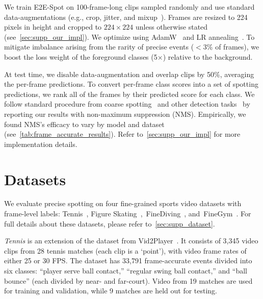 \documentclass[runningheads]{llncs}
\newcommand{\OURMETHOD}{{E2E-Spot}\xspace}
\newcommand{\finegym}{{FineGym}\xspace}
\newcommand{\finediving}{{FineDiving}\xspace}
\begin{document}
We train \OURMETHOD on 100-frame-long clips sampled randomly and use standard data-augmentations (e.g., crop, jitter, and mixup~\cite{mixup}).
Frames are resized to 224 pixels in height and cropped to $224\times224$ unless otherwise stated (see~\autoref{sec:supp_our_impl}).
We optimize using AdamW~\cite{adamw} and LR annealing~\cite{cosinelr}.
To mitigate imbalance arising from the rarity of precise events ($<3\%$ of frames), we boost the loss weight of the foreground classes (5$\times$) relative to the background.

At test time, we disable data-augmentation and overlap clips by 50\%, averaging
the per-frame predictions.
To convert per-frame class scores into a set of spotting
predictions, we rank all of the frames by their predicted score for each class.
We follow standard procedure from coarse spotting~\cite{soccernetv2} and other detection
tasks~\cite{rcnn} by reporting our results with non-maximum suppression
(NMS).
Empirically, we found NMS's efficacy to vary by model and dataset (see~\autoref{tab:frame_accurate_results}).
Refer to~\autoref{sec:supp_our_impl} for more implementation details.
 
\section{Datasets}
\label{sec:dataset}

We evaluate precise spotting on four fine-grained sports video datasets with
frame-level labels: Tennis~\cite{vid2player}, Figure
Skating~\cite{vpd},~\finediving~\cite{finediving}, and~\finegym~\cite{finegym}.
For full details about these datasets, please refer to~\autoref{sec:supp_dataset}.

\textit{Tennis} is an extension of the dataset from Vid2Player~\cite{vid2player}.
It consists of 3,345 video clips from 28 tennis matches (each clip is a `point'), with video frame rates of either 25 or 30 FPS.
The dataset has 33,791 frame-accurate events divided into six classes:
``player serve ball contact,'' ``regular swing ball contact,'' and ``ball bounce'' (each divided by near- and far-court).
Video from 19 matches are used for training and validation, while 9 matches are held out for testing.
\end{document}
